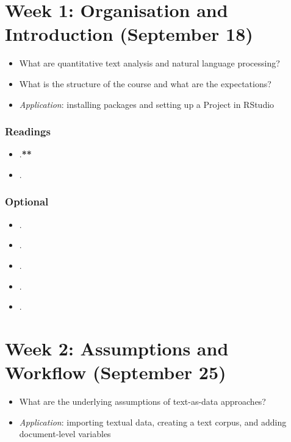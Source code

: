 \documentclass[abstract=on,parskip=full,headings=standardclasses,fontsize=11pt,paper=a4]{scrartcl}
\begin{document}
\tableofcontents

\section{Week 1: Organisation and Introduction (September 18)}

\begin{itemize}
\renewcommand\labelitemi{--}
\item What are quantitative text analysis and natural language processing?
\item What is the structure of the course and what are the expectations?
\item \textit{Application}: installing packages and setting up a Project in RStudio
\end{itemize}

\subsubsection*{Readings}
\begin{itemize}
\item {}.\textbf{**}
\item {}.
\end{itemize}

\subsubsection*{Optional}
\begin{itemize}
\item {}.
\item {}.
\item {}.
\item {}.
\item {}.
\end{itemize}


\section{Week 2: Assumptions and  Workflow (September 25)}

\begin{itemize}
\renewcommand\labelitemi{--}
\item What are the underlying assumptions of text-as-data approaches?
\item \textit{Application}: importing textual data, creating a text corpus, and adding document-level variables
\end{itemize}
\end{document}

